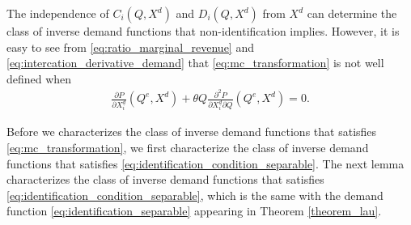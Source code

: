 \documentclass[11pt, a4paper]{article}
\theoremstyle{remark}
\begin{document}
The independence of $C_i(Q, X^{d})$ and $D_i(Q, X^{d})$ from $X^{d}$ can determine the class of inverse demand functions that non-identification implies.
However, it is easy to see from \eqref{eq:ratio_marginal_revenue} and \eqref{eq:intercation_derivative_demand} that \eqref{eq:mc_transformation} is not well defined when 
\begin{align}
    \frac{\partial P}{\partial X^{d}_i}(Q^e, X^{d}) + \theta Q\frac{\partial^2 P}{\partial X^{d}_{i}\partial Q}(Q^e, X^{d}) = 0. \label{eq:identification_condition_separable}
\end{align}

Before we characterizes the class of inverse demand functions that satisfies \eqref{eq:mc_transformation}, we first characterize the class of inverse demand functions that satisfies \eqref{eq:identification_condition_separable}.
The next lemma characterizes the class of inverse demand functions that satisfies \eqref{eq:identification_condition_separable}, which is the same with the demand function \eqref{eq:identification_separable} appearing in Theorem \ref{theorem_lau}. 
\end{document}
